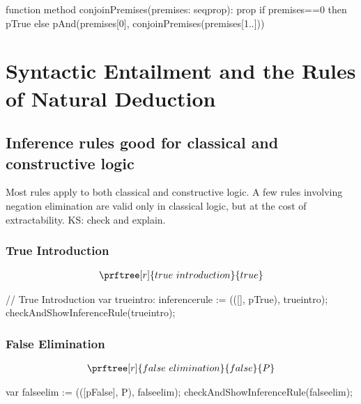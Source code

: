 \documentclass[letterpaper,10pt,english]{sphinxmanual}
\begin{document}
\begin{sphinxVerbatim}[commandchars=\\\{\}]
function method conjoinPremises(premises: seq\PYGZlt{}prop\PYGZgt{}): prop
\PYGZob{}
    if \textbar{}premises\textbar{}==0 then pTrue
    else pAnd(premises[0], conjoinPremises(premises[1..]))
\PYGZcb{}
\end{sphinxVerbatim}


\section{Syntactic Entailment and the Rules of Natural Deduction}
\label{\detokenize{13-consequence:syntactic-entailment-and-the-rules-of-natural-deduction}}

\subsection{Inference rules good for classical and constructive logic}
\label{\detokenize{13-consequence:inference-rules-good-for-classical-and-constructive-logic}}
Most rules apply to both classical and constructive logic.
A few rules involving negation elimination are valid only
in classical logic, but at the cost of extractability. KS:
check and explain.


\subsubsection{True Introduction}
\label{\detokenize{13-consequence:true-introduction}}\begin{equation*}
\begin{split}\prftree[r]{true\ introduction}{true}\end{split}
\end{equation*}
\begin{sphinxVerbatim}[commandchars=\\\{\}]
// True Introduction
var true\PYGZus{}intro: inference\PYGZus{}rule  := (([], pTrue), \PYGZdq{}true\PYGZus{}intro\PYGZdq{});
checkAndShowInferenceRule(true\PYGZus{}intro);
\end{sphinxVerbatim}


\subsubsection{False Elimination}
\label{\detokenize{13-consequence:false-elimination}}\begin{equation*}
\begin{split}\prftree[r]{false\ elimination}{false}{P}\end{split}
\end{equation*}
\begin{sphinxVerbatim}[commandchars=\\\{\}]
var false\PYGZus{}elim  := (([pFalse], P),              \PYGZdq{}false\PYGZus{}elim\PYGZdq{});
checkAndShowInferenceRule(false\PYGZus{}elim);
\end{sphinxVerbatim}
\end{document}
